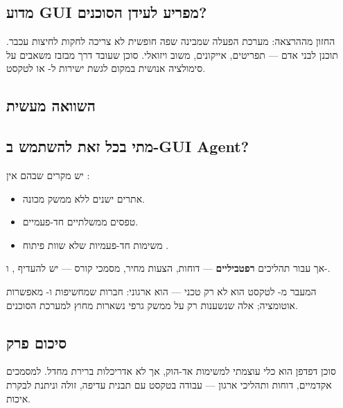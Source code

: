 \subsection{מדוע GUI מפריע לעידן הסוכנים?}

החזון מההרצאה: מערכת הפעלה שמבינה שפה חופשית לא צריכה לחקות לחיצות
עכבר.  תוכנן לבני אדם --- תפריטים, אייקונים, משוב ויזואלי.
סוכן שעובד דרך  מבזבז משאבים על סימולציה אנושית במקום לגשת
ישירות ל- או לטקסט.

\subsection{השוואה מעשית}


\subsection{מתי בכל זאת להשתמש ב-GUI Agent?}

יש מקרים שבהם אין :
\begin{itemize}[rightmargin=2em]
  \item אתרים ישנים ללא ממשק מכונה.
  \item טפסים ממשלתיים חד-פעמיים.
  \item משימות חד-פעמיות שלא שוות פיתוח .
\end{itemize}

אך עבור תהליכים \textbf{רפטביליים} --- דוחות, הצעות מחיר, מסמכי קורס ---
יש להעדיף ,  ו-.

\begin{insightbox}
המעבר מ- לטקסט הוא לא רק טכני --- הוא ארגוני: חברות שמחשיפות
 ו- מאפשרות אוטומציה; אלה שנשענות רק על ממשק גרפי
נשארות מחוץ למערכת הסוכנים.
\end{insightbox}

\subsection{סיכום פרק}

סוכן דפדפן הוא כלי עוצמתי למשימות אד-הוק, אך לא אדריכלות ברירת מחדל.
למסמכים אקדמיים, דוחות  ותהליכי ארגון --- עבודה בטקסט עם תבנית
 עדיפה, זולה וניתנת לבקרת איכות.
